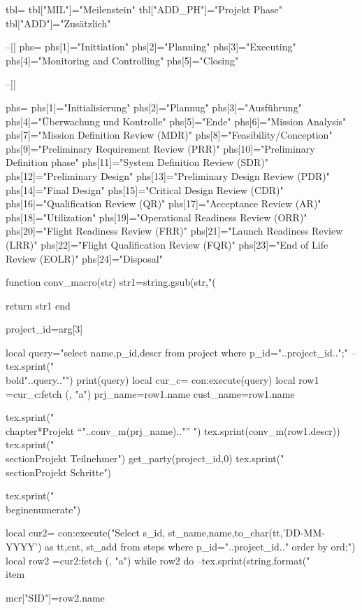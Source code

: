 \documentclass[a4paper,12pt]{report}
\begin{document}
\begin{luacode*}
tbl={}
tbl["MIL"]="Meilenstein"
tbl["ADD_PH"]="Projekt Phase"
tbl["ADD"]="Zusätzlich"


--[[
phs={}
phs[1]="Inittiation"
phs[2]="Planning"
phs[3]="Executing"
phs[4]="Monitoring and Controlling"
phs[5]="Closing"

--]]


phs={}
phs[1]="Initialisierung"
phs[2]="Plannug"
phs[3]="Ausführung"
phs[4]="Überwachung und Kontrolle"
phs[5]="Ende"
phs[6]="Mission Analysis"
phs[7]="Mission Definition Review (MDR)"
phs[8]="Feasibility/Conception"
phs[9]="Preliminary Requirement Review (PRR)"
phs[10]="Preliminary Definition phase"
phs[11]="System Definition Review (SDR)"
phs[12]="Preliminary Design"
phs[13]="Preliminary Design Review (PDR)"
phs[14]="Final Design"
phs[15]="Critical Design Review (CDR)"
phs[16]="Qualification Review (QR)"
phs[17]="Acceptance Review (AR)"
phs[18]="Utilization"
phs[19]="Operational Readiness Review (ORR)"
phs[20]="Flight Readiness Review (FRR)"
phs[21]="Launch Readiness Review (LRR)"
phs[22]="Flight Qualification Review (FQR)"
phs[23]="End of Life Review (EOLR)"
phs[24]="Disposal"



function conv_macro(str)
str1=string.gsub(str,"$$(%

return str1
end


project_id=arg[3]

   local query="select name,p_id,descr from project where p_id="..project_id..";"
   --tex.sprint("\\bold{"..query.."}\n")
   print(query)
        local cur_c= con:execute(query)
        local   row1 =cur_c:fetch ({}, "a")
	prj_name=row1.name
	cust_name=row1.name

   

    tex.sprint("\\chapter*{Projekt ``"..conv_m(prj_name).."'' }")
    tex.sprint(conv_m(row1.descr))
    tex.sprint("\\section{Projekt Teilnehmer}")
    get_party(project_id,0)
    tex.sprint("\\section{Projekt Schritte}")


    
    
               tex.sprint("\\begin{enumerate}")





		local cur2= con:execute("Select s_id, st_name,name,to_char(tt,'DD-MM-YYYY') as tt,cnt, st_add from steps where p_id="..project_id.." order by ord;")
                 local row2 =cur2:fetch ({}, "a")
		while row2 do
                        --tex.sprint(string.format("\\item{%
			mcr["SID"]=row2.name
                         
}
\end{luacode*}
\end{document}
